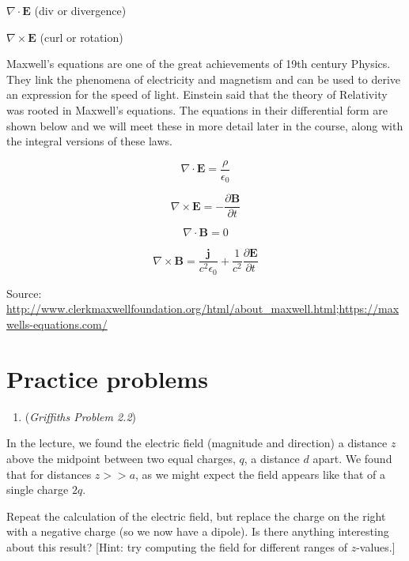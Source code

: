 \documentclass[
  letterpaper,
  DIV=11,
  numbers=noendperiod]{scrreprt}
\providecommand{\tightlist}{%
  \setlength{\itemsep}{0pt}\setlength{\parskip}{0pt}}\usepackage{longtable,booktabs,array}
\begin{document}
\(\nabla \cdot \mathbf{E}\) (div or divergence)

\(\nabla \times \mathbf{E}\) (curl or rotation)

Maxwell's equations are one of the great achievements of 19th century
Physics. They link the phenomena of electricity and magnetism and can be
used to derive an expression for the speed of light. Einstein said that
the theory of Relativity was rooted in Maxwell's equations. The
equations in their differential form are shown below and we will meet
these in more detail later in the course, along with the integral
versions of these laws.

\begin{equation}

\nabla \cdot \mathbf{E} = \frac{\rho}{\epsilon_0}
\end{equation}

\begin{equation}
\nabla \times \mathbf{E} = - \frac{\partial \mathbf{B}}{\partial t} 
\end{equation}

\begin{equation}
\nabla \cdot \mathbf{B} = 0
\end{equation}

\begin{equation}
\nabla \times \mathbf{B} = \frac{\mathbf{j}}{c^2 \epsilon_0} + \frac{1}{c^2} \frac{\partial \mathbf{E}}{\partial t}
\end{equation}

Source:
\url{http://www.clerkmaxwellfoundation.org/html/about_maxwell.html};\url{https://maxwells-equations.com/}

\section{Practice problems}\label{practice-problems}

\begin{enumerate}
\def\labelenumi{\arabic{enumi})}
\tightlist
\item
  (\emph{Griffiths Problem 2.2})
\end{enumerate}

In the lecture, we found the electric field (magnitude and direction) a
distance \(z\) above the midpoint between two equal charges, \(q\), a
distance \(d\) apart. We found that for distances \(z >> a\), as we
might expect the field appears like that of a single charge \(2q\).

Repeat the calculation of the electric field, but replace the charge on
the right with a negative charge (so we now have a dipole). Is there
anything interesting about this result? {[}Hint: try computing the field
for different ranges of \(z\)-values.{]}
\end{document}

